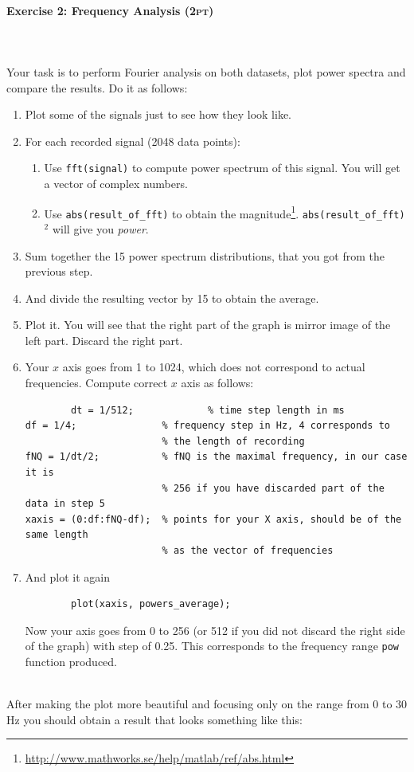 \documentclass[a4paper,11pt]{article}
\newenvironment{exercise}[3]{\paragraph{Exercise #1: #2 \textsc{(#3pt)}}\ \\}{
\medskip}
\begin{document}
\begin{exercise}{2}{Frequency Analysis}{2}
\ \\
Your task is to perform Fourier analysis on both datasets, plot power spectra and compare the results. Do it as follows:
\begin{enumerate}
	\item Plot some of the signals just to see how they look like.
	\item For each recorded signal (2048 data points):
		\begin{enumerate}
			\item Use \texttt{fft(signal)} to compute power spectrum of this signal. You will get a vector of complex numbers.
			\item Use \texttt{abs(result\_of\_fft)} to obtain the magnitude\footnote{\url{http://www.mathworks.se/help/matlab/ref/abs.html}}. \texttt{abs(result\_of\_fft)}$^2$ will give you \emph{power}.
		\end{enumerate}
	\item Sum together the 15 power spectrum distributions, that you got from the previous step.
	\item And divide the resulting vector by 15 to obtain the average.
	\item Plot it. You will see that the right part of the graph is mirror image of the left part. Discard the right part.
	\item Your $x$ axis goes from 1 to 1024, which does not correspond to actual frequencies. Compute correct $x$ axis as follows:
		\begin{verbatim}
		dt = 1/512;             % time step length in ms
df = 1/4;               % frequency step in Hz, 4 corresponds to 
                        % the length of recording
fNQ = 1/dt/2;           % fNQ is the maximal frequency, in our case it is
                        % 256 if you have discarded part of the data in step 5 
xaxis = (0:df:fNQ-df);  % points for your X axis, should be of the same length 
                        % as the vector of frequencies
		\end{verbatim}
	\item And plot it again
		\begin{verbatim}
		plot(xaxis, powers_average);
		\end{verbatim}
		Now your axis goes from 0 to 256 (or 512 if you did not discard the right side of the graph) with step of 0.25. This corresponds to the frequency range \texttt{pow} function produced.
\end{enumerate}

\ \\
After making the plot more beautiful and focusing only on the range from 0 to 30 Hz you should obtain a result that looks something like this:
\begin{figure}[H]


\end{figure}
\end{exercise}
\end{document}
